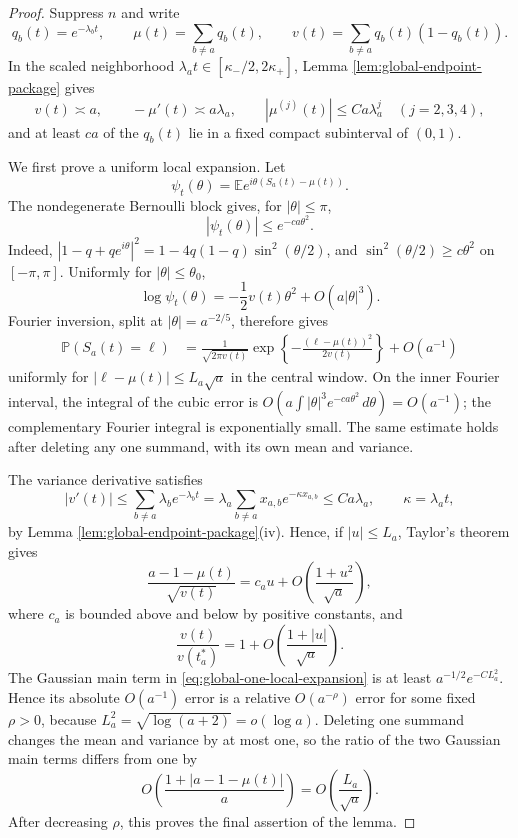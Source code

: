 \documentclass[11pt]{article}
\theoremstyle{remark}
\newcommand{\Pp}{\mathbb P}
\newcommand{\Ee}{\mathbb E}
\newcommand{\dd}{\,d}
\begin{document}
\begin{proof}
Suppress $n$ and write
\[
        q_b(t)=e^{-\lambda_bt},
        \qquad
        \mu(t)=\sum_{b\ne a}q_b(t),
        \qquad
        v(t)=\sum_{b\ne a}q_b(t)(1-q_b(t)).
\]
In the scaled neighborhood
$\lambda_at\in[\kappa_-/2,2\kappa_+]$, Lemma
\ref{lem:global-endpoint-package} gives
\[
        v(t)\asymp a,
        \qquad
        -\mu'(t)\asymp a\lambda_a,
        \qquad
        |\mu^{(j)}(t)|\le Ca\lambda_a^j
        \quad(j=2,3,4),
\]
and at least $ca$ of the $q_b(t)$ lie in a fixed compact subinterval of
$(0,1)$.

We first prove a uniform local expansion.  Let
\[
        \psi_t(\theta)=
        \Ee e^{i\theta(S_a(t)-\mu(t))}.
\]
The nondegenerate Bernoulli block gives, for $|\theta|\le\pi$,
\[
        |\psi_t(\theta)|\le e^{-ca\theta^2}.
\]
Indeed,
$|1-q+qe^{i\theta}|^2=1-4q(1-q)\sin^2(\theta/2)$, and
$\sin^2(\theta/2)\ge c\theta^2$ on $[-\pi,\pi]$.  Uniformly for
$|\theta|\le\theta_0$,
\[
        \log\psi_t(\theta)
        =-\frac12v(t)\theta^2+O(a|\theta|^3).
\]
Fourier inversion, split at $|\theta|=a^{-2/5}$, therefore gives
\begin{equation}
\begin{aligned}
        \Pp(S_a(t)=\ell)
        &=\frac{1}{\sqrt{2\pi v(t)}}
        \exp\left\{-\frac{(\ell-\mu(t))^2}{2v(t)}\right\}
        +O(a^{-1})
\end{aligned}
\label{eq:global-one-local-expansion}
\end{equation}
uniformly for $|\ell-\mu(t)|\le L_a\sqrt a$ in the central window.  On the
inner Fourier interval, the integral of the cubic error is
$O(a\int |\theta|^3e^{-ca\theta^2}\dd\theta)=O(a^{-1})$; the complementary
Fourier integral is exponentially small.  The same estimate holds after
deleting any one summand, with its own mean and variance.

The variance derivative satisfies
\[
        |v'(t)|
        \le \sum_{b\ne a}\lambda_b e^{-\lambda_bt}
        =\lambda_a\sum_{b\ne a}x_{a,b}e^{-\kappa x_{a,b}}
        \le Ca\lambda_a,
        \qquad \kappa=\lambda_at,
\]
by Lemma \ref{lem:global-endpoint-package}(iv).  Hence, if $|u|\le L_a$,
Taylor's theorem gives
\[
        \frac{a-1-\mu(t)}{\sqrt{v(t)}}
        =c_a u+O\left(\frac{1+u^2}{\sqrt a}\right),
\]
where $c_a$ is bounded above and below by positive constants, and
\[
        \frac{v(t)}{v(t_a^*)}=1+O\left(\frac{1+|u|}{\sqrt a}\right).
\]
The Gaussian main term in \eqref{eq:global-one-local-expansion} is at least
$a^{-1/2}e^{-CL_a^2}$.  Hence its absolute $O(a^{-1})$ error is a relative
$O(a^{-\rho})$ error for some fixed $\rho>0$, because
$L_a^2=\sqrt{\log(a+2)}=o(\log a)$.  Deleting one summand changes the mean and
variance by at most one, so the ratio of the two Gaussian main terms differs
from one by
\[
        O\left(\frac{1+|a-1-\mu(t)|}{a}\right)
        =O\left(\frac{L_a}{\sqrt a}\right).
\]
After decreasing $\rho$, this proves the final assertion of the lemma.


\end{proof}
\end{document}
